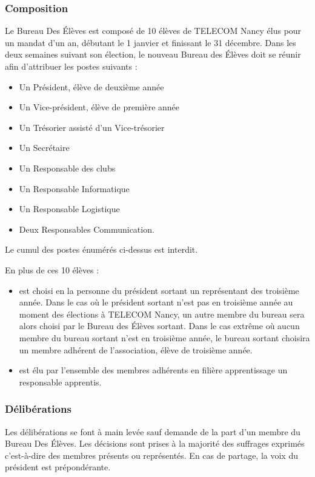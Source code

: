 \documentclass{article} %
\begin{document}
			\subsubsection{Composition}
				Le Bureau Des Élèves est composé de 10 élèves de TELECOM Nancy élus
				pour un mandat d’un an, débutant le 1 janvier et finissant le
				31 décembre. Dans les deux semaines suivant son élection, le nouveau
				Bureau des Élèves doit se réunir afin d'attribuer les postes suivants
				:
				\begin{itemize}
					\item Un Président, élève de deuxième année
					\item Un Vice-président, élève de première année
					\item Un Trésorier assisté d’un Vice-trésorier
					\item Un Secrétaire
					\item Un Responsable des clubs
					\item Un Responsable Informatique
					\item Un Responsable Logistique
					\item Deux Responsables Communication.
				\end{itemize}

				Le cumul des postes énumérés ci-dessus est interdit.

				En plus de ces 10 élèves :
				\begin{itemize}
					\item est choisi en la personne du président sortant un
					    représentant des troisième année. Dans le cas où le président
					    sortant n’est pas en troisième année au moment des élections
					    à TELECOM Nancy, un autre membre du bureau sera alors choisi
					    par le Bureau des Élèves sortant. Dans le cas extrême où
					    aucun membre du bureau sortant n’est en troisième année, le
					    bureau sortant choisira un membre adhérent de l'association,
					    élève de troisième année.
					\item est élu par l’ensemble des membres adhérents en filière
					    apprentissage un responsable apprentis.
				\end{itemize}

			\subsubsection{Délibérations}
				Les délibérations se font à main levée sauf demande de la part d’un
				membre du Bureau Des Élèves. Les décisions sont prises à la majorité
				des	suffrages exprimés c’est-à-dire des membres présents ou
				représentés. En cas de partage, la voix du président est
				prépondérante.
\end{document}
